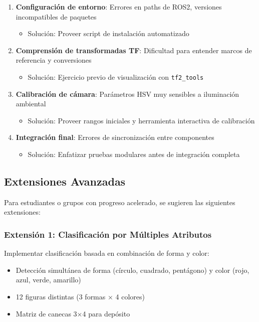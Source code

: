 \begin{enumerate}
    \item \textbf{Configuración de entorno}: Errores en paths de ROS2, versiones incompatibles de paquetes
    \begin{itemize}
        \item Solución: Proveer script de instalación automatizado
    \end{itemize}
    
    \item \textbf{Comprensión de transformadas TF}: Dificultad para entender marcos de referencia y conversiones
    \begin{itemize}
        \item Solución: Ejercicio previo de visualización con \texttt{tf2\_tools}
    \end{itemize}
    
    \item \textbf{Calibración de cámara}: Parámetros HSV muy sensibles a iluminación ambiental
    \begin{itemize}
        \item Solución: Proveer rangos iniciales y herramienta interactiva de calibración
    \end{itemize}
    
    \item \textbf{Integración final}: Errores de sincronización entre componentes
    \begin{itemize}
        \item Solución: Enfatizar pruebas modulares antes de integración completa
    \end{itemize}
\end{enumerate}

\subsection{Extensiones Avanzadas}

Para estudiantes o grupos con progreso acelerado, se sugieren las siguientes extensiones:

\subsubsection{Extensión 1: Clasificación por Múltiples Atributos}

Implementar clasificación basada en combinación de forma y color:
\begin{itemize}
    \item Detección simultánea de forma (círculo, cuadrado, pentágono) y color (rojo, azul, verde, amarillo)
    \item 12 figuras distintas (3 formas × 4 colores)
    \item Matriz de canecas 3×4 para depósito
\end{itemize}

